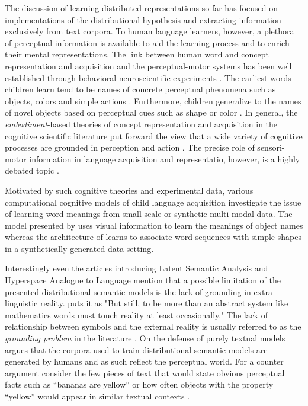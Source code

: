 The discussion of learning distributed representations so far has focused on
implementations of the distributional hypothesis and extracting information exclusively
from text corpora. To human language learners, however, a plethora of
perceptual information is available to aid the
learning process and to enrich their mental representations.
The link between human word and concept representation
and acquisition and the perceptual-motor systems has been well established through behavioral
neuroscientific experiments \citep{pulvermuller2005brain}.
The earliest words children learn tend to be names of concrete perceptual phenomena
such as objects, colors and simple actions \citep{bornstein2004cross}. Furthermore, children generalize to
the names of novel objects based on perceptual cues such as shape or color \citep{landau1998object}.
In general, the \emph{embodiment}-based theories of concept representation and acquisition in the
cognitive scientific literature put forward the view that a wide variety of cognitive processes
are grounded in perception and action \citep{meteyard2008role}. The precise role of
sensori-motor information in language acquisition and representatio, however, is a highly
debated topic \citep{meteyard2012coming}.

Motivated by such cognitive theories and experimental data,
various computational cognitive models of child
language acquisition investigate the issue
of learning word meanings from small scale or synthetic multi-modal data. The model presented by
\cite{yu2005emergence} uses visual information to learn the meanings of object
names whereas the architecture of \cite{roy2002learning} learns to associate word sequences
with simple shapes in a synthetically generated data setting.

Interestingly even the articles introducing Latent Semantic Analysis
\citep{landauer1997solution} and Hyperspace Analogue to Language \citep{lund1996producing} mention
that a possible limitation of the presented distributional semantic models is the lack of
grounding in extra-linguistic reality. \cite{landauer1997solution} puts it as "But still, to be more than
an abstract system like mathematics words must touch reality at least occasionally."
The lack of relationship between symbols and the external reality is usually referred
to as the \emph{grounding problem} in the literature \citep{harnad1990symbol,perfetti1998limits}.
On the defense of purely textual models \cite{louwerse2011symbol} argues that the corpora
used to train distributional semantic models are generated by humans and as such reflect the perceptual world.
For a counter argument consider the few pieces of text that would state obvious perceptual
facts such as ``bananas are yellow'' or how often objects with the property ``yellow''
would appear in similar textual contexts \citep{bruni2014multimodal}.

